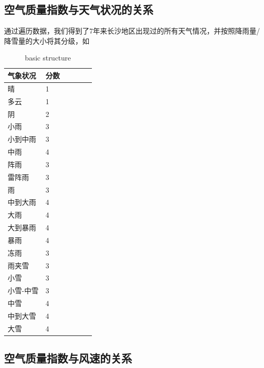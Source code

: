 \documentclass[UTF8,a4paper,10pt]{article}
\begin{document}
\subsection{空气质量指数与天气状况的关系}

\indent 通过遍历数据，我们得到了7年来长沙地区出现过的所有天气情况，并按照降雨量/降雪量的大小将其分级，如


\begin{table}[]
    \caption{basic structure}
    \vspace{20pt}
    \centering
    \begin{tabular}{p{2cm}p{3cm}p{2.5cm}p{2.5cm}p{2.5cm}p{2.5cm}}
        \toprule  %
        气象状况& 分数\\
        \midrule  %
        晴& 1\\
        多云& 1\\
        阴& 2\\
        小雨& 3\\
        小到中雨& 3\\
        中雨& 4\\
        阵雨& 3\\
        雷阵雨& 3\\
        雨& 3\\
        中到大雨& 4\\
        大雨& 4\\
        大到暴雨& 4\\
        暴雨& 4\\
        冻雨& 3\\
        雨夹雪& 3\\
        小雪& 3\\
        小雪-中雪& 3\\
        中雪& 4\\
        中到大雪& 4\\
        大雪& 4\\
        \bottomrule %
    \end{tabular}
    \label{bs2}
\end{table}






\subsection{空气质量指数与风速的关系}
\end{document}
